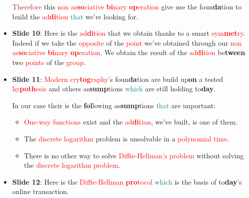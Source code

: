 \begin{itemize}
            \textcolor{brown}{Therefore} this \textcolor{red}{non as\textbf{so}ciative \textbf{bi}nary \textbf{op}eration}
            give use the foun\textbf{da}tion
            to build the \textcolor{red}{ad\textbf{di}tion} \textcolor{teal}{that} we're looking for.
        \item \textbf{Slide 10}: Here is the \textcolor{red}{ad\textbf{di}tion} that we obtain
            thanks to a smart \textcolor{red}{sym\textbf{met}ry}. Indeed if we take the
            \textcolor{red}{opposite} of the \textcolor{red}{point} we've
            obtained
            through our \textcolor{red}{non as\textbf{so}ciative \textbf{bi}nary \textbf{op}eration}. We obtain the result
            of the \textcolor{red}{ad\textbf{di}tion} be\textbf{tween} two
            \textcolor{red}{points} of the \textcolor{red}{group}.
        \item \textbf{Slide 11}: \textcolor{red}{Modern cry\textbf{tog}raphy}'s foun\textbf{da}tion are
            build up\textbf{on} a tested \textcolor{red}{hy\textbf{poth}esis} and others as\textbf{sump}tions
            \textcolor{teal}{which} are still
            holding to\textbf{day}.
            
            In our case their is the \textbf{fol}lowing as\textbf{sump}tions \textcolor{teal}{that} are important:
            \begin{itemize}
                \item \textcolor{red}{One-way functions} exist and the
                    \textcolor{red}{ad\textbf{di}tion}, we've built, is one of them.
                \item The \textcolor{red}{discrete logarithm} problem is unsolvable in a
                    \textcolor{red}{polynomial time}.
                \item There is no other way to solve \textcolor{red}{Diffie-Hellman's
                        problem} without solving
                    the \textcolor{red}{discrete logarithm problem}.
            \end{itemize}
        \item \textbf{Slide 12}: Here is the \textcolor{red}{Diffie-Hellman
                \textbf{pro}tocol} \textcolor{teal}{which} is the
            basis of to\textbf{day}'s online transaction.


\end{itemize}
